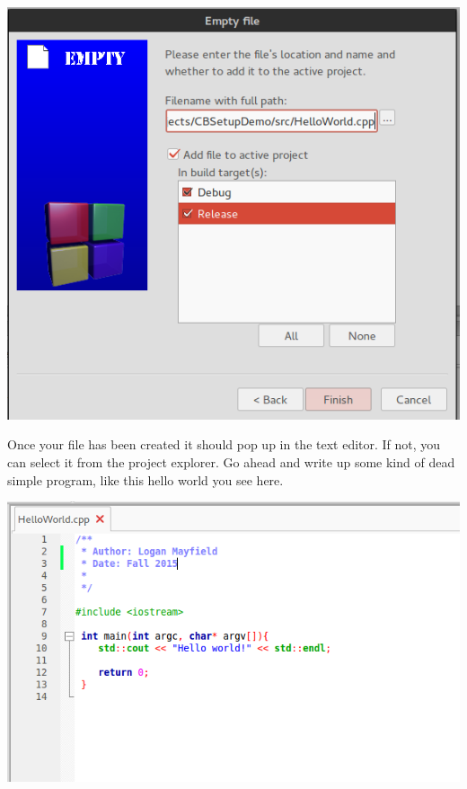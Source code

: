 \documentclass[10pt]{article}
\begin{document}
\vspace{.1in}
\begin{center}
\includegraphics[scale=.5]{CB_NewFileEmptyName.png}
\end{center}
\vspace{.1in}

Once your file has been created it should pop up in the text editor. If not, you can select it from the project explorer. Go ahead and write up some kind of dead simple program, like this hello world you see here. 

\vspace{.1in}
\begin{center}
\includegraphics[scale=.5]{CB_HelloWorld.png}
\end{center}
\vspace{.1in}
\end{document}
